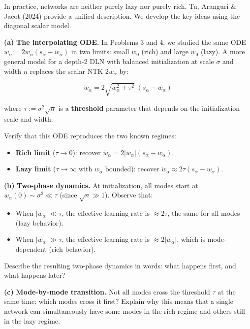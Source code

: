 \documentclass[
]{article}
\providecommand{\tightlist}{%
  \setlength{\itemsep}{0pt}\setlength{\parskip}{0pt}}
\begin{document}
In practice, networks are neither purely lazy nor purely rich. Tu,
Aranguri \& Jacot (2024) provide a unified description. We develop the
key ideas using the diagonal scalar model.

\textbf{(a)} \textbf{The interpolating ODE.} In Problems 3 and 4, we
studied the same ODE \(\dot{w}_\alpha = 2w_\alpha(s_\alpha - w_\alpha)\)
in two limits: small \(w_0\) (rich) and large \(w_0\) (lazy). A more
general model for a depth-2 DLN with balanced initialization at scale
\(\sigma\) and width \(n\) replaces the scalar NTK \(2w_\alpha\) by:

\[\dot{w}_\alpha = 2\sqrt{w_\alpha^2 + \tau^2}\;(s_\alpha - w_\alpha)\]

where \(\tau := \sigma^2 \sqrt{n}\) is a \textbf{threshold} parameter
that depends on the initialization scale and width.

Verify that this ODE reproduces the two known regimes:

\begin{itemize}
\tightlist
\item
  \textbf{Rich limit} (\(\tau \to 0\)): recover
  \(\dot{w}_\alpha = 2|w_\alpha|(s_\alpha - w_\alpha)\).
\item
  \textbf{Lazy limit} (\(\tau \to \infty\) with \(w_\alpha\) bounded):
  recover \(\dot{w}_\alpha \approx 2\tau(s_\alpha - w_\alpha)\).
\end{itemize}

\textbf{(b)} \textbf{Two-phase dynamics.} At initialization, all modes
start at \(w_\alpha(0) \sim \sigma^2 \ll \tau\) (since
\(\sqrt{n} \gg 1\)). Observe that:

\begin{itemize}
\tightlist
\item
  When \(|w_\alpha| \ll \tau\), the effective learning rate is
  \(\approx 2\tau\), the same for all modes (lazy behavior).
\item
  When \(|w_\alpha| \gg \tau\), the effective learning rate is
  \(\approx 2|w_\alpha|\), which is mode-dependent (rich behavior).
\end{itemize}

Describe the resulting two-phase dynamics in words: what happens first,
and what happens later?

\textbf{(c)} \textbf{Mode-by-mode transition.} Not all modes cross the
threshold \(\tau\) at the same time: which modes cross it first? Explain
why this means that a single network can simultaneously have some modes
in the rich regime and others still in the lazy regime.
\end{document}
